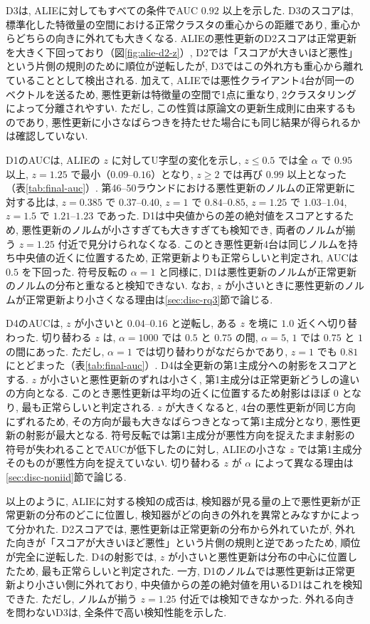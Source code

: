 \documentclass[a4j, twocolumn, dvipdfmx]{jsarticle}
\begin{document}
D3は, ALIEに対してもすべての条件でAUC $0.92$ 以上を示した. D3のスコアは, 標準化した特徴量の空間における正常クラスタの重心からの距離であり, 重心からどちらの向きに外れても大きくなる. ALIEの悪性更新のD2スコアは正常更新を大きく下回っており（図\ref{fig:alie-d2-z}）, D2では「スコアが大きいほど悪性」という片側の規則のために順位が逆転したが, D3ではこの外れ方も重心から離れていることとして検出される. 加えて, ALIEでは悪性クライアント4台が同一のベクトルを送るため, 悪性更新は特徴量の空間で1点に重なり, 2クラスタリングによって分離されやすい. ただし, この性質は原論文の更新生成則に由来するものであり, 悪性更新に小さなばらつきを持たせた場合にも同じ結果が得られるかは確認していない.

D1のAUCは, ALIEの $z$ に対してU字型の変化を示し, $z \le 0.5$ では全 $\alpha$ で $0.95$ 以上, $z=1.25$ で最小（$0.09$--$0.16$）となり, $z \ge 2$ では再び $0.99$ 以上となった（表\ref{tab:final-auc}）. 第46--50ラウンドにおける悪性更新のノルムの正常更新に対する比は, $z=0.385$ で $0.37$--$0.40$, $z=1$ で $0.84$--$0.85$, $z=1.25$ で $1.03$--$1.04$, $z=1.5$ で $1.21$--$1.23$ であった. D1は中央値からの差の絶対値をスコアとするため, 悪性更新のノルムが小さすぎても大きすぎても検知でき, 両者のノルムが揃う $z=1.25$ 付近で見分けられなくなる. このとき悪性更新4台は同じノルムを持ち中央値の近くに位置するため, 正常更新よりも正常らしいと判定され, AUCは $0.5$ を下回った. 符号反転の $\alpha=1$ と同様に, D1は悪性更新のノルムが正常更新のノルムの分布と重なると検知できない. なお, $z$ が小さいときに悪性更新のノルムが正常更新より小さくなる理由は\ref{sec:disc-rq3}節で論じる.

D4のAUCは, $z$ が小さいと $0.04$--$0.16$ と逆転し, ある $z$ を境に $1.0$ 近くへ切り替わった. 切り替わる $z$ は, $\alpha=1000$ では $0.5$ と $0.75$ の間, $\alpha=5,\,1$ では $0.75$ と $1$ の間にあった. ただし, $\alpha=1$ では切り替わりがなだらかであり, $z=1$ でも $0.81$ にとどまった（表\ref{tab:final-auc}）. D4は全更新の第1主成分への射影をスコアとする. $z$ が小さいと悪性更新のずれは小さく, 第1主成分は正常更新どうしの違いの方向となる. このとき悪性更新は平均の近くに位置するため射影はほぼ $0$ となり, 最も正常らしいと判定される. $z$ が大きくなると, 4台の悪性更新が同じ方向にずれるため, その方向が最も大きなばらつきとなって第1主成分となり, 悪性更新の射影が最大となる. 符号反転では第1主成分が悪性方向を捉えたまま射影の符号が失われることでAUCが低下したのに対し, ALIEの小さな $z$ では第1主成分そのものが悪性方向を捉えていない. 切り替わる $z$ が $\alpha$ によって異なる理由は\ref{sec:disc-noniid}節で論じる.

以上のように, ALIEに対する検知の成否は, 検知器が見る量の上で悪性更新が正常更新の分布のどこに位置し, 検知器がどの向きの外れを異常とみなすかによって分かれた. D2スコアでは, 悪性更新は正常更新の分布から外れていたが, 外れた向きが「スコアが大きいほど悪性」という片側の規則と逆であったため, 順位が完全に逆転した. D4の射影では, $z$ が小さいと悪性更新は分布の中心に位置したため, 最も正常らしいと判定された. 一方, D1のノルムでは悪性更新は正常更新より小さい側に外れており, 中央値からの差の絶対値を用いるD1はこれを検知できた. ただし, ノルムが揃う $z=1.25$ 付近では検知できなかった. 外れる向きを問わないD3は, 全条件で高い検知性能を示した.
\end{document}
